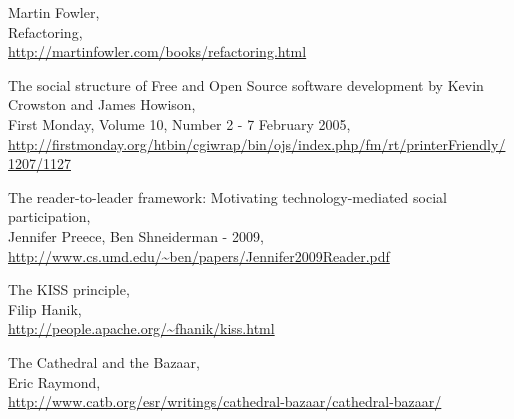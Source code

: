 \documentclass[11pt]{scrartcl}
\begin{document}
\begin{thebibliography}{9}
    Martin Fowler,\\
    Refactoring,\\
    \url{http://martinfowler.com/books/refactoring.html}

    The social structure of Free and Open Source software development by Kevin Crowston and James Howison,\\
    First Monday, Volume 10, Number 2 - 7 February 2005,\\
    \url{http://firstmonday.org/htbin/cgiwrap/bin/ojs/index.php/fm/rt/printerFriendly/1207/1127}
    
    The reader-to-leader framework: Motivating technology-mediated social participation,\\
    Jennifer Preece, Ben Shneiderman - 2009,\\
    \url{http://www.cs.umd.edu/~ben/papers/Jennifer2009Reader.pdf}

    The KISS principle,\\
    Filip Hanik,\\
    \url{http://people.apache.org/~fhanik/kiss.html}
    
    The Cathedral and the Bazaar,\\
    Eric Raymond,\\
    \url{http://www.catb.org/esr/writings/cathedral-bazaar/cathedral-bazaar/}
\end{thebibliography}
\end{document}
